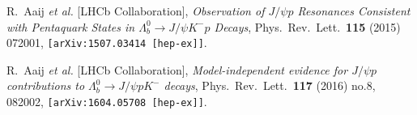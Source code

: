 \documentclass{PoS}
\begin{document}
\begin{thebibliography}{99}
  R.~Aaij {\it et al.} [LHCb Collaboration],
  \emph{Observation of $J/\psi p$ Resonances Consistent with Pentaquark States in $\Lambda_b^0 \to J/\psi K^- p$ Decays},
  Phys.\ Rev.\ Lett.\  {\bf 115} (2015) 072001,
  {\tt [arXiv:1507.03414 [hep-ex]]}.

  R.~Aaij {\it et al.} [LHCb Collaboration],
  \emph{Model-independent evidence for $J/\psi p$ contributions to $\Lambda_b^0\to J/\psi p K^-$ decays},
  Phys.\ Rev.\ Lett.\  {\bf 117} (2016) no.8,  082002,
  {\tt [arXiv:1604.05708 [hep-ex]]}.

\end{thebibliography}
\end{document}
